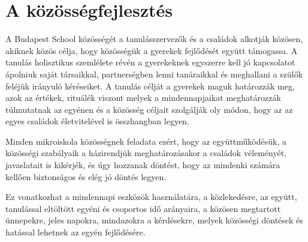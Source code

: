 \section{A közösségfejlesztés}
\label{sec:kozossegfejlesztes}
A Budapest School közösségét a tanulásszervezők és a családok alkotják közösen, akiknek közös célja, hogy közösségük a gyerekek fejlődését együtt támogassa. A tanulás holisztikus szemlélete révén a gyerekeknek egyszerre kell jó kapcsolatot ápolniuk saját társaikkal, partnerségben lenni tanáraikkal és meghallani a szülők feléjük irányuló kéréseiket.  A tanulás célját a gyerekek maguk határozzák meg, azok az értékek, rituálék viszont melyek a mindennapjaikat meghatározzák túlmutatnak az egyénen és a közösség céljait szolgálják oly módon, hogy az az egyes családok életvitelével is összhangban legyen.

Minden mikroiskola közösségnek feladata ezért, hogy az együttműködésük, a közösségi szabályaik a házirendjük meghatározásakor a családok véleményét, javaslatait is kikérjék, és úgy hozzanak döntést, hogy az mindenki számára kellően biztonságos és elég jó döntés legyen.

Ez vonatkozhat a mindennapi eszközök használatára, a közlekedésre, az együtt, tanulással eltöltött egyéni és csoportos idő arányaira, a közösen megtartott ünnepekre, jeles napokra,  mindazokra a kérdésekre, melyek közösségi döntések és hatással lehetnek az egyén fejlődésére.
